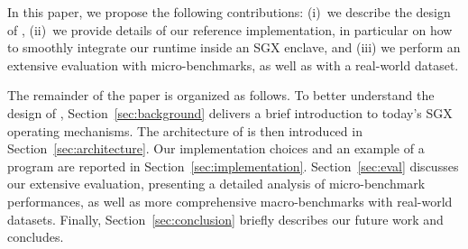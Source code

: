 
In this paper, we propose the following contributions: (i)~we describe the design of \SYS, (ii)~we provide details of our reference implementation, in particular on how to smoothly integrate our runtime inside an SGX enclave, and (iii) we perform an extensive evaluation with micro-benchmarks, as well as with a real-world dataset.

The remainder of the paper is organized as follows.
To better understand the design of \SYS, Section~\ref{sec:background} delivers a brief introduction to today's SGX operating mechanisms.
The architecture of \SYS{} is then introduced in Section~\ref{sec:architecture}.
Our implementation choices and an example of a \SYS{} program are reported in Section~\ref{sec:implementation}.
Section~\ref{sec:eval} discusses our extensive evaluation, presenting a detailed analysis of micro-benchmark performances, as well as more comprehensive macro-benchmarks with real-world datasets.
Finally, Section~\ref{sec:conclusion} briefly describes our future work and concludes.

